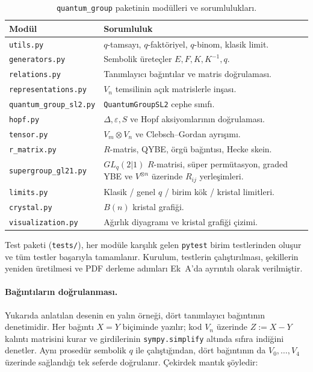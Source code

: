 \documentclass[12pt,a4paper,fleqn]{report}
\newcommand{\normalsemi}{;}
\newcommand{\normalsemi}{\begingroup\semicolonfont;\endgroup}
\numberwithin{equation}{chapter}
\theoremstyle{plain}
\theoremstyle{definition}
\newcommand{\eps}{\varepsilon}
\newcommand{\cop}{\Delta}
\begin{document}
\begin{table}[h]
\centering
\small
\caption{\texttt{quantum\_group} paketinin modülleri ve sorumlulukları.}
\label{tab:modules}
\begin{tabularx}{\textwidth}{@{}>{\raggedright\arraybackslash}p{}X@{}}
\toprule
Modül & Sorumluluk \\
\midrule
\texttt{utils.py} & $q$-tamsayı, $q$-faktöriyel, $q$-binom, klasik limit. \\
\texttt{generators.py} & Sembolik üreteçler $E, F, K, K^{-1}, q$. \\
\texttt{relations.py} & Tanımlayıcı bağıntılar ve matris doğrulaması. \\
\texttt{representations.py} & $V_n$ temsilinin açık matrislerle inşası. \\
\texttt{quantum\_group\_sl2.py} & \texttt{QuantumGroupSL2} cephe sınıfı. \\
\texttt{hopf.py} & $\cop, \eps, S$ ve Hopf aksiyomlarının doğrulaması. \\
\texttt{tensor.py} & $V_m \otimes V_n$ ve Clebsch--Gordan ayrışımı. \\
\texttt{r\_matrix.py} & $R$-matris, QYBE, örgü bağıntısı, Hecke skein. \\
\texttt{supergroup\_gl21.py} & $GL_q(2|1)$ $R$-matrisi, süper permütasyon, graded YBE ve $V^{\otimes n}$ üzerinde $R_{ij}$ yerleşimleri. \\
\texttt{limits.py} & Klasik / genel $q$ / birim kök / kristal limitleri. \\
\texttt{crystal.py} & $B(n)$ kristal grafiği. \\
\texttt{visualization.py} & Ağırlık diyagramı ve kristal grafiği çizimi. \\
\bottomrule
\end{tabularx}
\end{table}

Test paketi (\texttt{tests/}), her modüle karşılık gelen \texttt{pytest} birim
testlerinden oluşur ve tüm testler başarıyla tamamlanır. Kurulum, testlerin
çalıştırılması, şekillerin yeniden üretilmesi ve PDF derleme adımları
Ek~A'da ayrıntılı olarak verilmiştir.

\paragraph{Bağıntıların doğrulanması.} Yukarıda anlatılan desenin en yalın
örneği, dört tanımlayıcı bağıntının denetimidir. Her bağıntı $X = Y$ biçiminde
yazılır\normalsemi{} kod $V_n$ üzerinde $Z := X - Y$ kalıntı matrisini kurar ve girdilerinin
\texttt{sympy.simplify} altında sıfıra indiğini denetler. Aynı prosedür sembolik
$q$ ile çalıştığından, dört bağıntının da $V_0,\dots,V_4$ üzerinde sağlandığı
tek seferde doğrulanır. Çekirdek mantık şöyledir:
\end{document}
